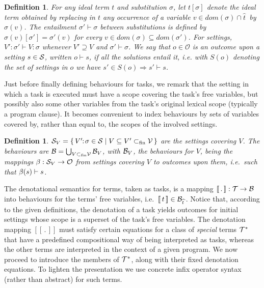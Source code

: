 \documentclass{tlp}
\def\set#1#2{\{\,#1\;|\;#2\,\}}
\def\subfin{_{\mathrm{fin}}}
\def\fsubset{\subset\subfin}
\newcommand{\dom}[1]{\mathit{dom}(#1)}
\def\imp{\rightarrow}
\def\Imp{\Rightarrow}
\def\B{{\cal B}}               \def\C{{\cal C}}               \def\E{{\cal E}}               \def\F{{\cal F}}
\def\S{{\cal S}}               \def\T{{\cal T}}               \def\V{{\cal V}}               \def\dlt{\triangle}
\def\denotstart{[\![\,}
\def\denotend{\,]\!]}
\def\denot#1{\denotstart#1\denotend}
\newtheorem{definition}[theorem]{Definition}
\def\OO{\mathcal O}
\def\Stng{\S}
\def\Out{\OO}
\def\s{\sigma}
\def\fv#1{\widehat{#1}}
\def\stng#1#2{#1\!\!:\!#2}
\def\ous#1#2{#1\vdash#2}
\begin{document}
\begin{definition}
  For any ideal term $t$ and substitution $\s$, let $t[\s]$ denote the ideal term
  obtained by replacing in $t$ any occurrence of a variable $v\in\dom\s\cap\fv t\,$ by $\s(v)$.
 The \emph{entailment} $\s'\vdash \s$
  between substitutions is defined by $\s(v)[\s']=\s'(v)$ for every
  $v\in\dom\s\subseteq\dom{\s'}$. For settings, $\stng{V'}{\s'}\vdash\stng{V}{\s}$ whenever
  $V'\supseteq V$ and $\s'\vdash\s$.
  We say that $o\in\Out$ is an outcome \emph{upon} a setting
  $s\in\Stng$, written $\ous os$, if all the solutions entail it, i.e. with $S(o)$
  denoting the \emph{set} of settings in $o$ we have $s'\in
  S(o)\Imp s'\vdash s$.
\end{definition}

Just before finally defining behaviours for tasks, we remark that the setting in which a task
is executed must have a scope covering the task's free variables, but
possibly also some other variables from the task's original lexical scope (typically a
program clause). It becomes convenient to index behaviours by sets of
variables covered by, rather than equal to, the scopes of the involved settings.

\begin{definition}
  $\S_V=\set{\stng{V'}\s\in\S}{V\subseteq V'\fsubset\V}$ are the settings
  \emph{covering} $V$. The \emph{behaviours} are $\B=\bigcup_{V\fsubset\V}\B_V$, with
  $\B_V$, the behaviours \emph{for} $V$, being the mappings $\be:\S_V\imp\Out$ from
  settings covering $V$ to outcomes upon them, i.e.\ such that $\ous{\be(s)}s$.

\end{definition}

The denotational semantics for terms, taken as tasks, is a mapping $\denot
.:\T\imp\B$ into behaviours for the terms' free variables, i.e.\ $\denot
t\in\B_{\fv t}\,$. Notice that, according to the given definitions, the denotation
of a task yields outcomes for initial settings whose scope is a superset of the
task's free variables. The denotation mapping $\denot .$ must satisfy certain
equations for a class of \emph{special} terms $\T^\ast$ that have a predefined
compositional way of being interpreted as tasks, whereas the other terms are
interpreted in the context of a given program. We now proceed to introduce the
members of $\T^\ast$, along with their fixed denotation equations. To lighten the
presentation we use concrete infix operator syntax (rather than abstract) for
such terms.
\end{document}
